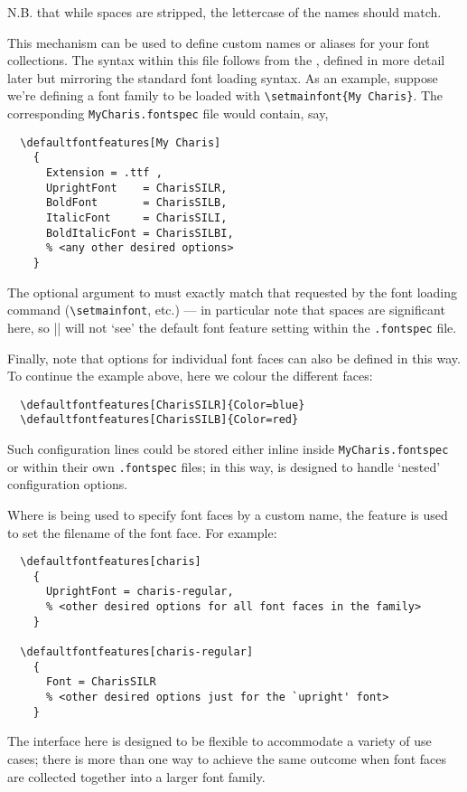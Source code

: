 \documentclass[a4paper]{l3doc}
\begin{document}
N.B. that while spaces are stripped, the lettercase of the names should match.

This mechanism can be used to define custom names or aliases for your font collections.
The syntax within this file follows from the , defined in more detail later but mirroring the standard  font loading syntax.
As an example, suppose we're defining a font family to be loaded with \verb|\setmainfont{My Charis}|.
The corresponding \texttt{MyCharis.fontspec} file would contain, say,
\begin{Verbatim}
  \defaultfontfeatures[My Charis]
    {
      Extension = .ttf ,
      UprightFont    = CharisSILR,
      BoldFont       = CharisSILB,
      ItalicFont     = CharisSILI,
      BoldItalicFont = CharisSILBI,
      % <any other desired options>
    }
\end{Verbatim}
The optional argument to  must exactly match that requested by the font loading command (\verb|\setmainfont|, etc.) --- in particular note that spaces are significant here, so |\setmainfont{MyCharis}| will not `see' the default font feature setting within the \texttt{.fontspec} file.

Finally, note that options for individual font faces can also be defined in this way.
To continue the example above, here we colour the different faces:
\begin{Verbatim}
  \defaultfontfeatures[CharisSILR]{Color=blue}
  \defaultfontfeatures[CharisSILB]{Color=red}
\end{Verbatim}
Such configuration lines could be stored either inline inside \texttt{MyCharis.fontspec}
or within their own \texttt{.fontspec} files; in this way,  is designed to
handle `nested' configuration options.

Where  is being used to specify font faces by a custom name,
the  feature is used to set the filename of the font face. For example:
\begin{Verbatim}
  \defaultfontfeatures[charis]
    {
      UprightFont = charis-regular,
      % <other desired options for all font faces in the family>
    }

  \defaultfontfeatures[charis-regular]
    {
      Font = CharisSILR
      % <other desired options just for the `upright' font>
    }
\end{Verbatim}
The  interface here is designed to be flexible to accommodate a variety
of use cases; there is more than one way to achieve the same outcome when font faces are
collected together into a larger font family.
\end{document}
